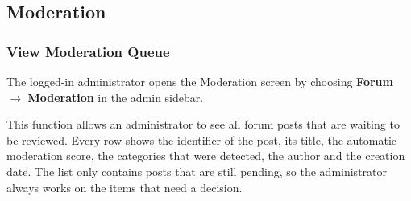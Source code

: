 
\subsection{Moderation}

\subsubsection{View Moderation Queue}

 The logged-in administrator opens the Moderation screen by choosing \textbf{Forum} $\rightarrow$ \textbf{Moderation} in the admin sidebar.

 This function allows an administrator to see all forum posts that are waiting to be reviewed. Every row shows the identifier of the post, its title, the automatic moderation score, the categories that were detected, the author and the creation date. The list only contains posts that are still pending, so the administrator always works on the items that need a decision.


